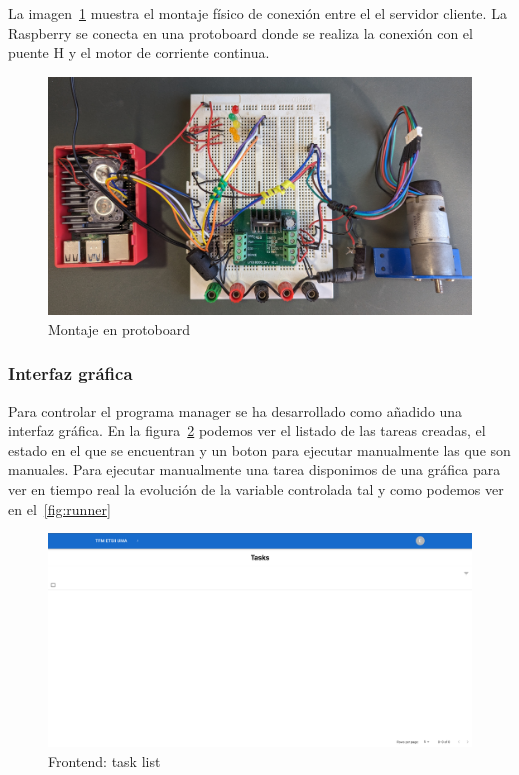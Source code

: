 La imagen~\cref{fig:montaje en protoboard} muestra el montaje físico de conexión entre el el servidor cliente.
La Raspberry se conecta en una protoboard donde se realiza la conexión con el puente H y el motor de corriente continua.

\begin{figure}[H]
    \centering
    \includegraphics[height=0.2\textheight]{./part/Ejecucion/Seguimiento/PuestaAPunto/img/montajeProtoboard}
    \caption{Montaje en protoboard}\label{fig:montaje en protoboard}
\end{figure}

\subsubsection{Interfaz gráfica}

Para controlar el programa manager se ha desarrollado como añadido una interfaz gráfica.
En la figura~\cref{fig:frontend} podemos ver el listado de las tareas creadas, el estado en el que se encuentran y un boton para ejecutar manualmente las que son manuales.
Para ejecutar manualmente una tarea disponimos de una gráfica para ver en tiempo real la evolución de la variable controlada tal y como podemos ver en el~\cref{fig:runner}

\begin{figure}[H]
    \centering
    \includegraphics[height=0.2\textheight]{./part/Ejecucion/Seguimiento/PuestaAPunto/img/frontend}
    \caption{Frontend: task list}\label{fig:frontend}
\end{figure}

